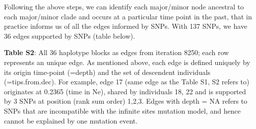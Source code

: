 \documentclass[
]{article}
\begin{document}
Following the above steps, we can identify each major/minor node
ancestral to each major/minor clade and occurs at a particular time
point in the past, that in practice informs us of all the edges informed
by SNPs. With 137 SNPs, we have 36 edges supported by SNPs (table
below).


{ \footnotesize \textbf{Table S2}: All 36 haplotype blocks as edges from iteration 8250;
each row represents an unique edge. As mentioned above, each edge is
defined uniquely by its origin time-point (=depth) and the set of
descendent individuals (=tips.from.dec). For example, edge 17 (same edge
as the Table S1, S2 refers to) originates at 0.2365 (time in Ne), shared
by individuals 18, 22 and is supported by 3 SNPs at position (rank sum
order) 1,2,3. Edges with depth = NA refers to SNPs that are incompatible
with the infinite sites mutation model, and hence cannot be explained by
one mutation event.}
\end{document}
